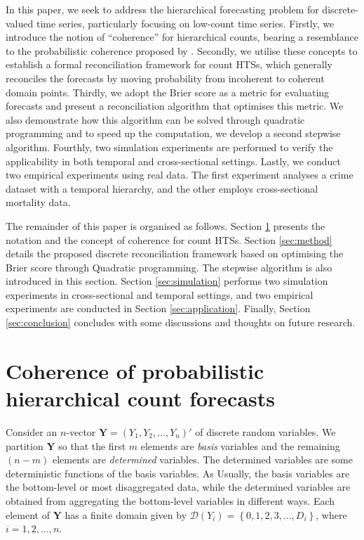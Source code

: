 \documentclass[a4paper,review,12pt,authoryear]{elsarticle}
\newcommand{\bY}{\mathbf{Y}}
\begin{document}
In this paper, we seek to address the hierarchical forecasting problem for discrete-valued time series, particularly focusing on low-count time series.
Firstly, we introduce the notion of ``coherence'' for hierarchical counts,
bearing a resemblance to the probabilistic coherence proposed by \cite{panagiotelisProbabilisticForecastReconciliation2022}.
Secondly, we utilise these concepts to establish a formal reconciliation framework for count HTSs, which generally reconciles the forecasts by moving probability from incoherent to coherent domain points.
Thirdly, we adopt the Brier score as a metric for evaluating forecasts and present a reconciliation algorithm that optimises this metric.
We also demonstrate how this algorithm can be solved through quadratic programming and to speed up the computation, we develop a second stepwise algorithm.
Fourthly, two simulation experiments are performed to verify the applicability in both temporal and cross-sectional settings.
Lastly, we conduct two empirical experiments using real data. The first experiment analyses a crime dataset with a temporal hierarchy, and the other employs cross-sectional mortality data.

The remainder of this paper is organised as follows.
Section \ref{sec:coherence} presents the notation and the concept of coherence for count HTSs.
Section \ref{sec:method} details the proposed discrete reconciliation framework based on optimising the Brier score through Quadratic programming. The stepwise algorithm is also introduced in this section.
Section \ref{sec:simulation} performs two simulation experiments in cross-sectional and temporal settings, and two empirical experiments are conducted in Section \ref{sec:application}.
Finally, Section \ref{sec:conclusion} concludes with some discussions and thoughts on future research.



\section{Coherence of probabilistic hierarchical count forecasts}

\label{sec:coherence}



Consider an $n$-vector $\bY=\left(Y_1,Y_2,\ldots,Y_n\right)'$ of discrete random variables.
We partition $\bY$ so that the first $m$ elements are \textit{basis} variables and the remaining $(n-m)$ elements are \textit{determined} variables.
The determined variables are some deterministic functions of the basis variables. As Usually, the basis variables are the bottom-level or most disaggregated data, while the determined variables are obtained from aggregating the bottom-level variables in different ways.
Each element of $\bY$ has a finite domain given by $\mathcal{D}(Y_i)=\left\{0, 1,2,3,\dots,D_i\right\}$, where $i = 1, 2, \dots, n$.
\end{document}
